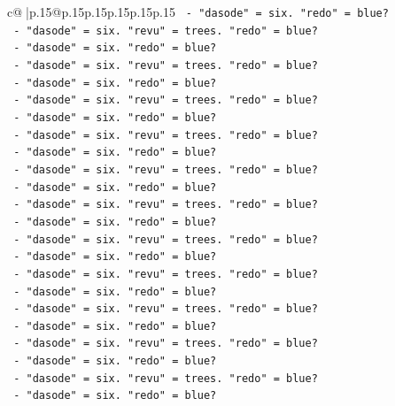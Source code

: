 \documentclass{article}
\begin{document}
{\begin{supertabular}{c@{$\;$}|p{.15\linewidth}@{}p{.15\linewidth}p{.15\linewidth}p{.15\linewidth}p{.15\linewidth}p{.15\linewidth}}
{{{\texttt{                    {-} "dasode" = six. "redo" = blue?} \\
\texttt{                    {-} "dasode" = six. "revu" = trees. "redo" = blue?} \\
\texttt{                    {-} "dasode" = six. "redo" = blue?} \\
\texttt{                    {-} "dasode" = six. "revu" = trees. "redo" = blue?} \\
\texttt{                    {-} "dasode" = six. "redo" = blue?} \\
\texttt{                    {-} "dasode" = six. "revu" = trees. "redo" = blue?} \\
\texttt{                    {-} "dasode" = six. "redo" = blue?} \\
\texttt{                    {-} "dasode" = six. "revu" = trees. "redo" = blue?} \\
\texttt{                    {-} "dasode" = six. "redo" = blue?} \\
\texttt{                    {-} "dasode" = six. "revu" = trees. "redo" = blue?} \\
\texttt{                    {-} "dasode" = six. "redo" = blue?} \\
\texttt{                    {-} "dasode" = six. "revu" = trees. "redo" = blue?} \\
\texttt{                    {-} "dasode" = six. "redo" = blue?} \\
\texttt{                    {-} "dasode" = six. "revu" = trees. "redo" = blue?} \\
\texttt{                    {-} "dasode" = six. "redo" = blue?} \\
\texttt{                    {-} "dasode" = six. "revu" = trees. "redo" = blue?} \\
\texttt{                    {-} "dasode" = six. "redo" = blue?} \\
\texttt{                    {-} "dasode" = six. "revu" = trees. "redo" = blue?} \\
\texttt{                    {-} "dasode" = six. "redo" = blue?} \\
\texttt{                    {-} "dasode" = six. "revu" = trees. "redo" = blue?} \\
\texttt{                    {-} "dasode" = six. "redo" = blue?} \\
\texttt{                    {-} "dasode" = six. "revu" = trees. "redo" = blue?} \\
\texttt{                    {-} "dasode" = six. "redo" = blue?} \\
}}}
\end{supertabular}}
\end{document}
